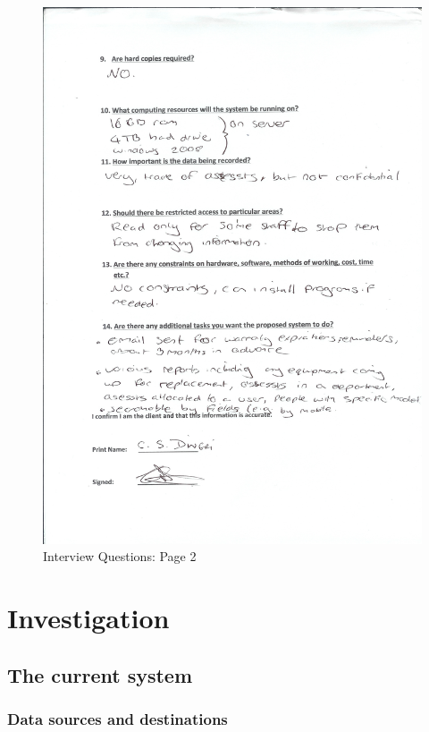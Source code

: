 \begin{figure}[H]
\includegraphics[width=.9\textwidth,height=.9\textheight,keepaspectratio]{Page2Interview.jpg}
\caption{Interview Questions: Page 2} \label{Page1Interview}
\end{figure}

\section{Investigation}

\subsection{The current system}

\subsubsection{Data sources and destinations}

